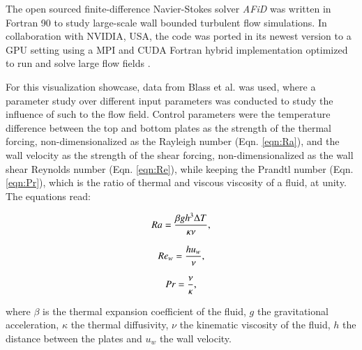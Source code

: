 \documentclass[final,5p,times,twocolumn]{elsarticle}
\begin{document}
The open sourced finite-difference Navier-Stokes solver \textit{AFiD} \cite{poe15c} was written in Fortran 90 to study large-scale wall bounded turbulent flow simulations. In collaboration with NVIDIA, USA, the code was ported in its newest version to a GPU setting using a MPI and CUDA Fortran hybrid implementation optimized to run and solve large flow fields \cite{zhu18b}.

For this visualization showcase, data from Blass et al. \cite{bla18} was used, where a parameter study over different input parameters was conducted to study the influence of such to the flow field. Control parameters were the temperature difference between the top and bottom plates as the strength of the thermal forcing, non-dimensionalized as the Rayleigh number (Eqn. \ref{eqn:Ra}), and the wall velocity as the strength of the shear forcing, non-dimensionalized as the wall shear Reynolds number (Eqn. \ref{eqn:Re}), while keeping the Prandtl number (Eqn. \ref{eqn:Pr}), which is the ratio of thermal and viscous viscosity of a fluid, at unity. The equations read:

\begin{equation} %
Ra= \frac{\beta gh^3\Delta T}{\kappa\nu}, 
\label{eqn:Ra} \\[8pt]
\end{equation}

\begin{equation} %
Re_w= \frac{hu_w}{\nu},
\label{eqn:Re} \\[8pt]
\end{equation}

\begin{equation} %
Pr= \frac{\nu}{\kappa},
\label{eqn:Pr} \\[8pt]
\end{equation}


where $ \beta $ is the thermal expansion coefficient of the fluid, $ g $ the
gravitational acceleration, $ \kappa $ the thermal diffusivity, $ \nu $ the
kinematic viscosity of the fluid, $ h $ the distance between the plates and
$ u_w $ the wall velocity.
\end{document}
